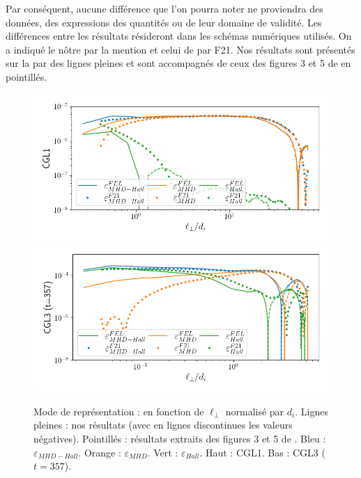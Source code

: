  Par conséquent, aucune différence que l'on pourra noter ne proviendra des données, des expressions des quantités ou de leur domaine de validité. Les différences entre les résultats résideront dans les schémas numériques utilisés. On a indiqué le nôtre par la mention  et celui de  par \og F21\fg{}.  Nos résultats sont présentés sur la  par des lignes pleines et sont accompagnés de ceux des figures 3 et 5 de  en pointillés. 
 
 \begin{figure}[!ht]
  \centering
 \includegraphics[width=0.85\linewidth,trim=0.5cm 0.5cm 0.5cm 0.5cm, clip=true]{./Mainmatter/Part_3/images_ch2/CGL1_compainc}
 \includegraphics[width=0.85\linewidth,trim=0.5cm 0.5cm 0.5cm 0.5cm, clip=true]{./Mainmatter/Part_3/images_ch2/CGL3_compainc}
 \cprotect\caption{Mode de représentation :  en fonction de \ensuremath{\ell_{\perp}} normalisé par \ensuremath{d_i}. Lignes pleines : nos résultats (avec en lignes discontinues les valeurs négatives). Pointillés : résultats extraits des figures 3 et 5 de . Bleu : \ensuremath{\varepsilon_{MHD-Hall}}. Orange : \ensuremath{\varepsilon_{MHD}}. Vert : \ensuremath{\varepsilon_{Hall}}. Haut : CGL1. Bas : CGL3 (\ensuremath{t =\num{357}}).}
 \label{fig:compainc}
 \end{figure}
 
